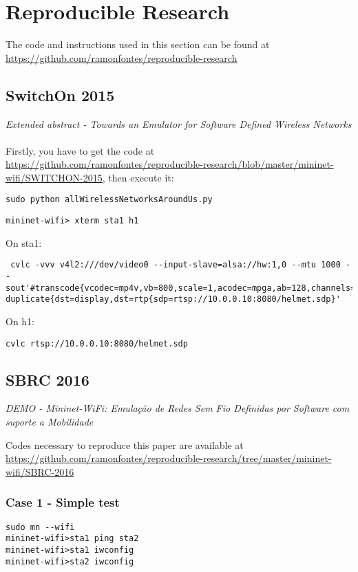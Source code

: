\chapter{Reproducible Research}

The code and instructions used in this section can be found at \url{https://github.com/ramonfontes/reproducible-research}

\section{SwitchOn 2015}
\textit{Extended abstract - Towards an Emulator for Software Defined Wireless Networks}\\
\textbf{}
\\
Firstly, you have to get the code at \url{https://github.com/ramonfontes/reproducible-research/blob/master/mininet-wifi/SWITCHON-2015}, then execute it:

\begin{verbatim}
sudo python allWirelessNetworksAroundUs.py
\end{verbatim}

\begin{verbatim}
mininet-wifi> xterm sta1 h1
\end{verbatim}

\noindent On sta1:
\begin{verbatim}
 cvlc -vvv v4l2:///dev/video0 --input-slave=alsa://hw:1,0 --mtu 1000 --sout'#transcode{vcodec=mp4v,vb=800,scale=1,acodec=mpga,ab=128,channels=1}: duplicate{dst=display,dst=rtp{sdp=rtsp://10.0.0.10:8080/helmet.sdp}'
\end{verbatim}

\noindent On h1:
\begin{verbatim}
cvlc rtsp://10.0.0.10:8080/helmet.sdp
\end{verbatim}

\section{SBRC 2016}
\textit{DEMO - Mininet-WiFi: Emulação de Redes Sem Fio Definidas por Software com suporte a Mobilidade}

Codes necessary to reproduce this paper are available at \url{https://github.com/ramonfontes/reproducible-research/tree/master/mininet-wifi/SBRC-2016}

\subsection{Case 1 - Simple test}
\begin{verbatim}
sudo mn --wifi  
mininet-wifi>sta1 ping sta2  
mininet-wifi>sta1 iwconfig  
mininet-wifi>sta2 iwconfig
\end{verbatim}
   
